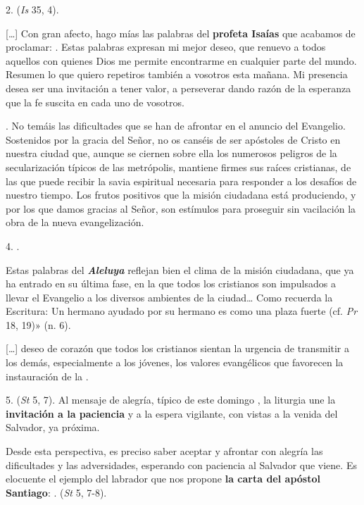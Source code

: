 2.  (\emph{Is} 35, 4).

[\ldots{}] Con gran afecto, hago mías las palabras del \textbf{profeta Isaías} que acabamos de proclamar: . Estas palabras expresan mi mejor deseo, que renuevo a todos aquellos con quienes Dios me permite encontrarme en cualquier parte del mundo. Resumen lo que quiero repetiros también a vosotros esta mañana. Mi presencia desea ser una invitación a tener valor, a perseverar dando razón de la esperanza que la fe suscita en cada uno de vosotros.

. No temáis las dificultades que se han de afrontar en el anuncio del Evangelio. Sostenidos por la gracia del Señor, no os canséis de ser apóstoles de Cristo en nuestra ciudad que, aunque se ciernen sobre ella los numerosos peligros de la secularización típicos de las metrópolis, mantiene firmes sus raíces cristianas, de las que puede recibir la savia espiritual necesaria para responder a los desafíos de nuestro tiempo. Los frutos positivos que la misión ciudadana está produciendo, y por los que damos gracias al Señor, son estímulos para proseguir sin vacilación la obra de la nueva evangelización.

4. .

Estas palabras del \emph{\textbf{Aleluya}} reflejan bien el clima de la misión ciudadana, que ya ha entrado en su última fase, en la que todos los cristianos son impulsados a llevar el Evangelio a los diversos ambientes de la ciudad\ldots{} Como recuerda la Escritura: Un hermano ayudado por su hermano es como una plaza fuerte (cf. \emph{Pr} 18, 19)» (n. 6).

[\ldots{}] deseo de corazón que todos los cristianos sientan la urgencia de transmitir a los demás, especialmente a los jóvenes, los valores evangélicos que favorecen la instauración de la .

5.  (\emph{St} 5, 7). Al mensaje de alegría, típico de este domingo , la liturgia une la \textbf{invitación a la paciencia} y a la espera vigilante, con vistas a la venida del Salvador, ya próxima.

Desde esta perspectiva, es preciso saber aceptar y afrontar con alegría las dificultades y las adversidades, esperando con paciencia al Salvador que viene. Es elocuente el ejemplo del labrador que nos propone \textbf{la carta del apóstol Santiago}: .  (\emph{St} 5, 7-8).

